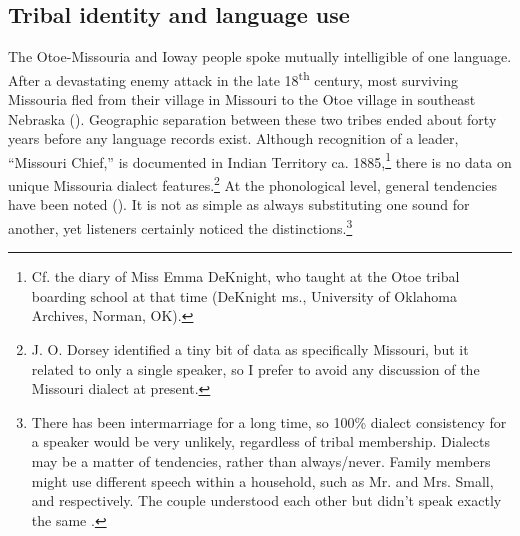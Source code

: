 \documentclass[output=paper]{LSP/langsci}
\begin{document}
\subsection{Tribal identity and language use} 	
The Otoe-Missouria and Ioway people spoke mutually intelligible  of one language.  After a devastating enemy attack in the late 18\textsuperscript{th} century, most surviving Missouria fled from their village in Missouri to the Otoe village in southeast Nebraska (\citealt{Schweitzer2001}).  Geographic separation between these two tribes ended about forty years before any language records exist.  Although recognition of a leader, ``Missouri Chief,'' is documented in Indian Territory ca. 1885,\footnote{Cf. the diary of Miss Emma DeKnight, who taught at the Otoe tribal boarding school at that time (DeKnight ms., University of Oklahoma Archives, Norman, OK).}  there is no data on unique Missouria dialect features.\footnote{J. O. Dorsey identified a tiny bit of data as specifically Missouri, but it related to only a single speaker, so I prefer to avoid any discussion of the Missouri dialect at present.}  At the phonological level, general tendencies have been noted (). It is not as simple as always substituting one sound for another, yet listeners certainly noticed the distinctions.\footnote{There has been intermarriage for a long time, so 100\% dialect consistency for a speaker would be very unlikely, regardless of tribal membership. Dialects may be a matter of tendencies, rather than always/never. Family members might use different speech within a household, such as Mr. and Mrs. Small,  and  respectively. The couple understood each other but didn't speak exactly the same \citep{Marsh1936}.}	
\end{document}
